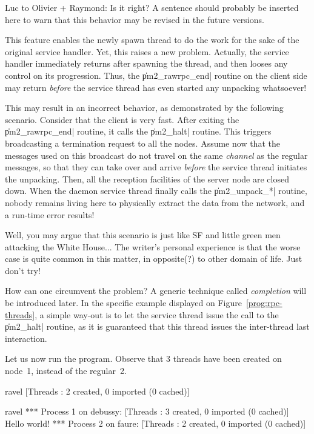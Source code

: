\begin{note}
  Luc to Olivier + Raymond: Is it right? A sentence should probably be
  inserted here to warn that this behavior may be revised in the
  future versions.
\end{note}

This feature enables the newly spawn thread to do the work for the
sake of the original service handler. Yet, this raises a new
problem. Actually, the service handler immediately returns after
spawning the thread, and then looses any control on its
progression. Thus, the \|pm2_rawrpc_end| routine on the client side
may return \emph{before} the service thread has even started any
unpacking whatsoever! 

This may result in an incorrect behavior, as demonstrated by the
following scenario. Consider that the client is very fast. After
exiting the \|pm2_rawrpc_end| routine, it calls the \|pm2_halt|
routine. This triggers broadcasting a termination request to all the
nodes. Assume now that the messages used on this broadcast do not
travel on the same \emph{channel} as the regular messages, so that
they can take over and arrive \emph{before} the service thread
initiates the unpacking. Then, all the reception facilities of the
server node are closed down. When the daemon service thread finally
calls the \|pm2_unpack_*| routine, nobody remains living here to
physically extract the data from the network, and a run-time error
results!

Well, you may argue that this scenario is just like SF and little
green men attacking the White House... The writer's personal
experience is that the worse case is quite common in this matter, in
opposite(?) to other domain of life. Just don't try!

How can one circumvent the problem? A generic technique called
\emph{completion} will be introduced later. In the specific example
displayed on Figure~\ref{prog:rpc-threads}, a simple way-out is to let
the service thread issue the call to the \|pm2_halt| routine, as it is
guaranteed that this thread issues the inter-thread last interaction.

Let us now run the program. Observe that 3 threads have been
created on node~1, instead of the regular~2.
\begin{shell}
ravel%
[Threads : 2 created, 0 imported (0 cached)]

ravel%
*** Process 1 on debussy:
[Threads : 3 created, 0 imported (0 cached)]
Hello world!
*** Process 2 on faure:
[Threads : 2 created, 0 imported (0 cached)]
\end{shell}

